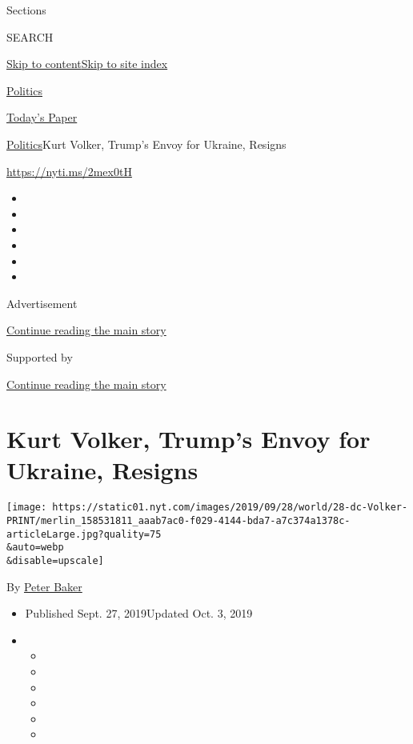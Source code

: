 Sections

SEARCH

\protect\hyperlink{site-content}{Skip to
content}\protect\hyperlink{site-index}{Skip to site index}

\href{https://www.nytimes.com/section/politics}{Politics}

\href{https://myaccount.nytimes.com/auth/login?response_type=cookie\&client_id=vi}{}

\href{https://www.nytimes.com/section/todayspaper}{Today's Paper}

\href{/section/politics}{Politics}\textbar{}Kurt Volker, Trump's Envoy
for Ukraine, Resigns

\url{https://nyti.ms/2mex0tH}

\begin{itemize}
\item
\item
\item
\item
\item
\item
\end{itemize}

Advertisement

\protect\hyperlink{after-top}{Continue reading the main story}

Supported by

\protect\hyperlink{after-sponsor}{Continue reading the main story}

\hypertarget{kurt-volker-trumps-envoy-for-ukraine-resigns}{%
\section{Kurt Volker, Trump's Envoy for Ukraine,
Resigns}\label{kurt-volker-trumps-envoy-for-ukraine-resigns}}

\texttt{[image: https://static01.nyt.com/images/2019/09/28/world/28-dc-Volker-PRINT/merlin\_158531811\_aaab7ac0-f029-4144-bda7-a7c374a1378c-articleLarge.jpg?quality=75\\\&auto=webp\\\&disable=upscale]}

By \href{https://www.nytimes.com/by/peter-baker}{Peter Baker}

\begin{itemize}
\item
  Published Sept. 27, 2019Updated Oct. 3, 2019
\item
  \begin{itemize}
  \item
  \item
  \item
  \item
  \item
  \item
  \end{itemize}
\end{itemize}

